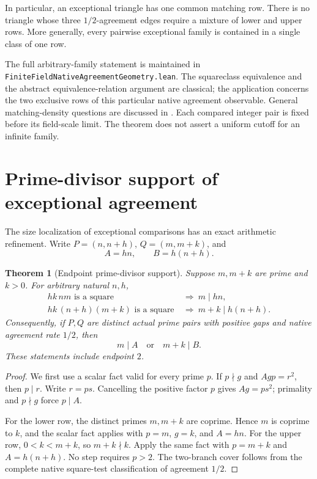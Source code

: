 \documentclass[11pt]{article}
\newtheorem{theorem}{Theorem}[section]
\begin{document}
In particular, an exceptional triangle has one common matching row.
There is no triangle whose three \(1/2\)-agreement edges require a
mixture of lower and upper rows. More generally, every pairwise
exceptional family is contained in a single class of one row.

The full arbitrary-family statement is maintained in
\texttt{FiniteFieldNativeAgreementGeometry.\allowbreak lean}.
The squareclass equivalence and the abstract equivalence-relation
argument are classical; the application concerns the two exclusive
rows of this particular native agreement observable.
General matching-density questions are discussed in
\cite{WaljiMatchingDensities}.
Each compared integer pair is fixed before its field-scale limit.
The theorem does not assert a uniform cutoff for an infinite family.

\section{Prime-divisor support of exceptional agreement}
\label{sec:native-endpoint-divisors}

The size localization of exceptional comparisons has an exact
arithmetic refinement. Write \(P=(n,n+h)\), \(Q=(m,m+k)\),
and
\[
 A=hn,\qquad B=h(n+h).
\]

\begin{theorem}[Endpoint prime-divisor support]
\label{thm:native-endpoint-divisors}
Suppose \(m,m+k\) are prime and \(k>0\). For arbitrary
natural \(n,h\),
\[
 \begin{split}
 hk\,nm\text{ is a square}&\ \Longrightarrow\ m\mid hn,\\
 hk\,(n+h)(m+k)\text{ is a square}
   &\ \Longrightarrow\ m+k\mid h(n+h).
 \end{split}
\]
Consequently, if \(P,Q\) are distinct actual prime pairs with
positive gaps and native agreement rate \(1/2\), then
\[
 \boxed{m\mid A\quad\text{or}\quad m+k\mid B.}
\]
These statements include endpoint \(2\).
\end{theorem}

\begin{proof}
We first use a scalar fact valid for every prime \(p\).
If \(p\nmid g\) and \(Agp=r^2\), then \(p\mid r\).
Write \(r=ps\). Cancelling the positive factor \(p\) gives
\(Ag=ps^2\); primality and \(p\nmid g\) force \(p\mid A\).

For the lower row, the distinct primes \(m,m+k\) are coprime.
Hence \(m\) is coprime to \(k\), and the scalar fact applies
with \(p=m\), \(g=k\), and \(A=hn\).
For the upper row, \(0<k<m+k\), so \(m+k\nmid k\).
Apply the same fact with \(p=m+k\) and \(A=h(n+h)\).
No step requires \(p>2\).
The two-branch cover follows from the complete native square-test
classification of agreement \(1/2\).
\end{proof}
\end{document}
